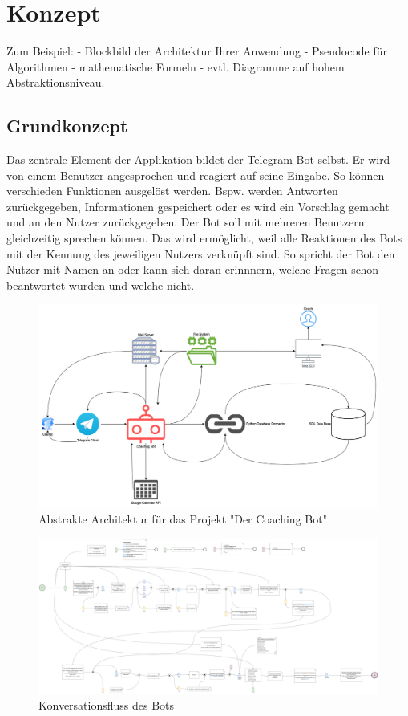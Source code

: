 \label{Konzept}
\chapter{Konzept}

Zum Beispiel:  
- Blockbild der Architektur Ihrer Anwendung  
- Pseudocode für Algorithmen  
- mathematische Formeln  
- evtl. Diagramme auf hohem Abstraktionsniveau.  

\section{Grundkonzept}

 	Das zentrale Element der Applikation bildet der Telegram-Bot selbst. Er wird von einem Benutzer angesprochen und reagiert auf seine Eingabe. So können verschieden Funktionen ausgelöst werden. Bspw. werden Antworten zurückgegeben, Informationen gespeichert oder es wird ein Vorschlag gemacht und an den Nutzer zurückgegeben. Der Bot soll mit mehreren Benutzern gleichzeitig sprechen können. Das wird ermöglicht, weil alle Reaktionen des Bots mit der Kennung des jeweiligen Nutzers verknüpft sind. So spricht der Bot den Nutzer mit Namen an oder kann sich daran erinnnern, welche Fragen schon beantwortet wurden und welche nicht.	 


 \begin{figure} %
	\centering
	\includegraphics[width=1.0\textwidth]{images/220213_PA28464_Architecture.png}
	\caption{Abstrakte Architektur für das Projekt "Der Coaching Bot"}
	\label{architecture}
\end{figure}


\begin{figure} %
	\centering
	\includegraphics[width=1.0\textwidth]{images/220213_PA28464_Conversation_Flow.png}
	\caption{Konversationsfluss des Bots}
	\label{conversationFlow}
\end{figure}


